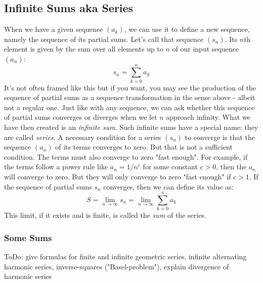 \subsection{Infinite Sums aka Series}
When we have a given sequence $(a_k)$, we can use it to define a new sequence, namely the sequence of its partial sums. Let's call that sequence $(s_n)$. Its $n$th element is given by the sum over all elements up to $n$ of our input sequence $(a_n)$:
\begin{equation}
 s_n = \sum_{k=0}^n a_k
\end{equation}
It's not often framed like this but if you want, you may see the production of the sequence of partial sums as a sequence transformation in the sense above - albeit not a regular one. Just like with any sequence, we can ask whether this sequence of partial sums converges or diverges when we let $n$ approach infinity. What we have then created is an \emph{infinite sum}. Such infinite sums have a special name: they are called \emph{series}. A necessary condition for a series $(s_n)$ to converge is that the sequence $(a_n)$ of its terms converges to zero. But that is not a sufficient condition. The terms must also converge to zero "fast enough". For example, if the terms follow a power rule like $a_n = 1 / n^c$ for some constant $c > 0$, then the $a_n$ will converge to zero. But they will only converge to zero "fast enough" if $c > 1$. If the sequence of partial sums $s_n$ converges, then we can define its value as:
\begin{equation}
 S = \lim_{n \rightarrow \infty} s_n = \lim_{n \rightarrow \infty} \sum_{k=0}^n a_k
\end{equation}
This limit, if it exists and is finite, is called the \emph{sum} of the series. 



\subsubsection{Some Sums}
ToDo: give formulas for finite and infinite geometric series, infinite alternating harmonic series, inverse-squares ("Basel-problem"), explain divergence of harmonic series



